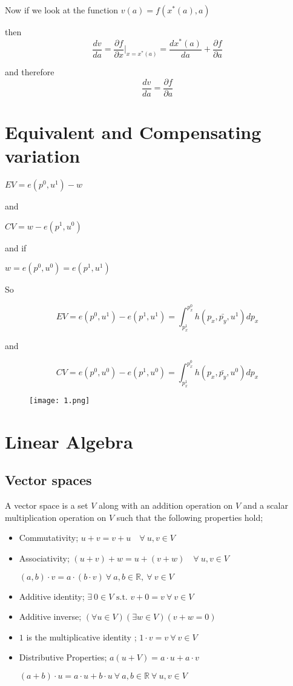 \documentclass[12pt,a4paper]{article}
\begin{document}
Now if we look at the function \(v(a)=f(x^*(a),a)\) 

then \[\frac{dv}{da}=\frac{\partial f}{\partial x}\bigg\lvert_{x=x^*(a)}=\frac{dx^*(a)}{da}+\frac{\partial f}{\partial a}\]

and therefore \[\frac{dv}{da}=\frac{\partial f}{\partial a}\]

\section{Equivalent and Compensating variation}
\(EV = e(p^0,u^1)-w\)

and

\(CV = w- e(p^1,u^0)\) 

and  if

\(w=e(p^0,u^0)=e(p^1,u^1)\) 

So 

\[EV = e(p^0,u^1)-e(p^1,u^1)=\int_{p_{x}^1}^{p_{x}^0} h(p_{x}, \bar{p_{y}}  ,u^1)dp_{x}\]

and

\[CV = e(p^0,u^0)- e(p^1,u^0)=\int_{p_{x}^1}^{p_{x}^0} h(p_{x}, \bar{p_{y}}  ,u^0)dp_{x}\]
\begin{figure}[H]
    \centering
    \texttt{[image: 1.png]}
\end{figure}

\section{Linear Algebra}
\subsection{Vector spaces}
A vector space is a set \(V\) along with an addition operation on \(V\) and a scalar multiplication operation on \(V\) such that the following properties hold;
\begin{itemize}
    \item Commutativity;  \(u+v=v+u \quad \forall \ u, v \in V\)
    \item Associativity;  \((u+v)+w=u+(v+w) \quad \forall \ u,v \in V\)
  
    \((a,b)\cdot v= a\cdot (b \cdot v) \ \forall \ a,b \in \mathbb{R}, \ \forall \ v \in V \)
    \item Additive identity; \(\exists \ 0 \in V \text{ s.t. } v+0=v \ \forall \ v \in V    \)
    \item Additive inverse; \(\left( \forall u \in V  \right) \left( \exists w \in V    \right) \left( v+w=0 \right) \)  
    \item \(1\) is the multiplicative identity ; \(1 \cdot v = v \ \forall \ v \in V\)   
    \item Distributive Properties; \(a(u+V)=a\cdot u + a \cdot v\)
    
    \((a+b)\cdot u = a \cdot u + b \cdot u \ \forall \ a,b \in \mathbb{R} \ \forall \ u, v \in V\)  
\end{itemize} 
\end{document}
